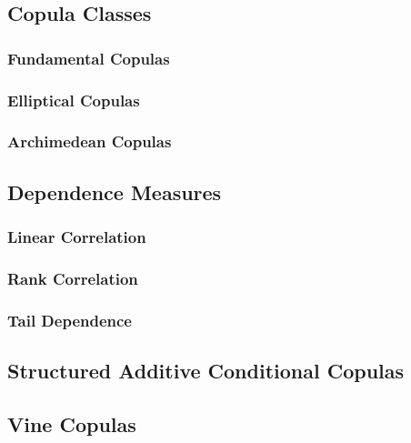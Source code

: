\documentclass[11pt, twoside]{article}
\numberwithin{equation}{section}
\numberwithin{table}{section}
\numberwithin{figure}{section}
\begin{document}
\subsection{Copula Classes} \label{ssec:copula_classes}

\subsubsection{Fundamental Copulas} \label{sssec:fundamental_copulas}

\subsubsection{Elliptical Copulas} \label{sssec:elliptical_copulas}

\subsubsection{Archimedean Copulas} \label{sssec:archimedean_copulas}

\subsection{Dependence Measures} \label{ssec:dependence_measures}

\subsubsection{Linear Correlation} \label{sssec:linear_correlation}

\subsubsection{Rank Correlation} \label{sssec:rank_correlation}

\subsubsection{Tail Dependence} \label{sssec:tail_dependence}

\subsection{Structured Additive Conditional Copulas} \label{ssec:conditional_copulas}

\subsection{Vine Copulas} \label{ssec:vine_copulas}

\newpage
\thispagestyle{empty}
\cleardoublepage
\end{document}
